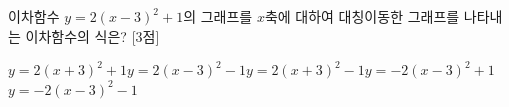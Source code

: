 이차함수 $y=2(x-3)^2+1$의 그래프를 $x$축에 대하여 대칭이동한 그래프를 나타내는 이차함수의 식은? \mbox{[3점]}
\begin{choicesii}{$y=2(x+3)^2+1$}{$y=2(x-3)^2-1$}{$y=2(x+3)^2-1$}{$y=-2(x-3)^2+1$}{$y=-2(x-3)^2-1$}\end{choicesii}
